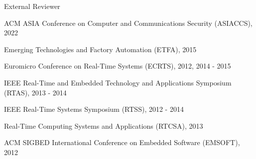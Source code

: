 \documentclass[11pt,letterpaper]{article}
\begin{document}
\begin{envtime}[]{External Reviewer}{}
	\item{ACM ASIA Conference on Computer and Communications Security (ASIACCS)}{, 2022}
	\item{Emerging Technologies and Factory Automation (ETFA)}{, 2015}
	\item{Euromicro Conference on Real-Time Systems (ECRTS)}{, 2012, 2014 - 2015}
	\item{IEEE Real-Time and Embedded Technology and Applications Symposium (RTAS)}{, 2013 - 2014}
	\item{IEEE Real-Time Systems Symposium (RTSS)}{, 2012 - 2014}
	\item{Real-Time Computing Systems and Applications (RTCSA)}{, 2013}
	\item{ACM SIGBED International Conference on Embedded Software (EMSOFT)}{, 2012}





						
\end{envtime}
\end{document}
